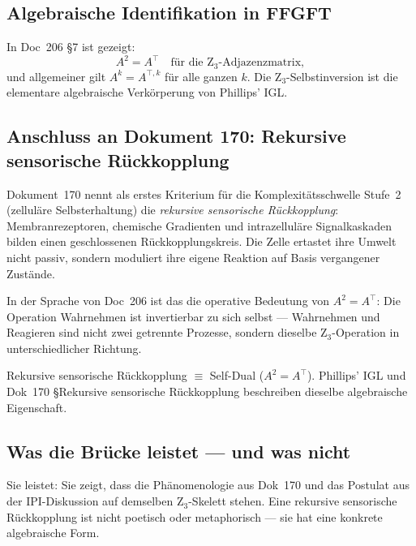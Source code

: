 \subsection{Algebraische Identifikation in FFGFT}

In Doc~206 \S7 ist gezeigt:
\begin{equation}
A^2 = A^\top \quad \text{für die Z}_3\text{-Adjazenzmatrix},
\end{equation}
und allgemeiner gilt $A^k = A^{\top, k}$ für alle ganzen $k$. Die Z$_3$-Selbstinversion ist die elementare algebraische Verkörperung von Phillips' IGL.

\subsection{Anschluss an Dokument 170: Rekursive sensorische Rückkopplung}

Dokument~170 nennt als erstes Kriterium für die Komplexitätsschwelle Stufe~2 (zelluläre Selbsterhaltung) die \emph{rekursive sensorische Rückkopplung}: Membranrezeptoren, chemische Gradienten und intrazelluläre Signalkaskaden bilden einen geschlossenen Rückkopplungskreis. Die Zelle ertastet ihre Umwelt nicht passiv, sondern moduliert ihre eigene Reaktion auf Basis vergangener Zustände.

In der Sprache von Doc~206 ist das die operative Bedeutung von $A^2 = A^\top$: Die Operation \glqq Wahrnehmen\grqq{} ist invertierbar zu sich selbst — Wahrnehmen und Reagieren sind nicht zwei getrennte Prozesse, sondern dieselbe Z$_3$-Operation in unterschiedlicher Richtung.

\begin{insightBox}
Rekursive sensorische Rückkopplung $\equiv$ Self-Dual ($A^2 = A^\top$). Phillips' IGL und Dok~170 \S{}Rekursive sensorische Rückkopplung beschreiben dieselbe algebraische Eigenschaft.
\end{insightBox}

\subsection{Was die Brücke leistet — und was nicht}

Sie leistet: Sie zeigt, dass die Phänomenologie aus Dok~170 und das Postulat aus der IPI-Diskussion auf demselben Z$_3$-Skelett stehen. Eine \glqq rekursive sensorische Rückkopplung\grqq{} ist nicht poetisch oder metaphorisch — sie hat eine konkrete algebraische Form.

